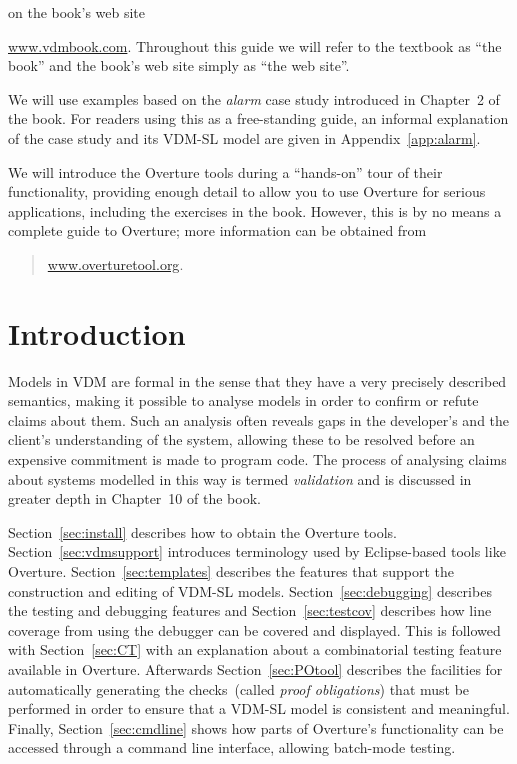 on the book's web site~{\url{www.vdmbook.com}. Throughout this guide
  we will refer to the textbook as ``the book'' and the book's web
  site simply as ``the web site''.

We will use examples based on the \emph{alarm} case study introduced
in Chapter~2 of the book. For readers using this as a
free-standing guide, an informal explanation of the case study and its
VDM-SL model are given in Appendix~\ref{app:alarm}.

We will introduce the Overture tools during a ``hands-on'' tour of
their functionality, providing enough detail to allow you to use
Overture for serious applications, including the exercises in the
book. However, this is by no means a complete guide to Overture; more
information can be obtained from
\begin{quote}
\url{www.overturetool.org}.
\end{quote}

\section{Introduction}

Models in VDM are formal in the sense that they have a very precisely
described semantics, making it possible to analyse models in order to
confirm or refute claims about them. Such an analysis often reveals
gaps in the developer's and the client's understanding of the system,
allowing these to be resolved before an expensive commitment is made
to program code. The process of analysing claims about systems
modelled in this way is termed \emph{validation} and is discussed in
greater depth in Chapter~10 of the book.

Section~\ref{sec:install} describes how to obtain the Overture tools.
Section~\ref{sec:vdmsupport} introduces terminology used by
Eclipse-based tools like Overture. Section~\ref{sec:templates}
describes the features that support the construction and editing of
VDM-SL models.  Section~\ref{sec:debugging} describes the testing and
debugging features and Section~\ref{sec:testcov} describes how
line coverage from using the debugger can be covered and
displayed. This is followed with Section~\ref{sec:CT} with an
explanation about a combinatorial testing feature available in Overture.
Afterwards Section~\ref{sec:POtool} describes the facilities for automatically
generating the checks~(called \emph{proof obligations}) that must
be performed in order to ensure that a VDM-SL model is consistent and
meaningful.  Finally, Section~\ref{sec:cmdline} shows how parts of
Overture's functionality can be accessed through a command line
interface, allowing batch-mode testing. 

}
